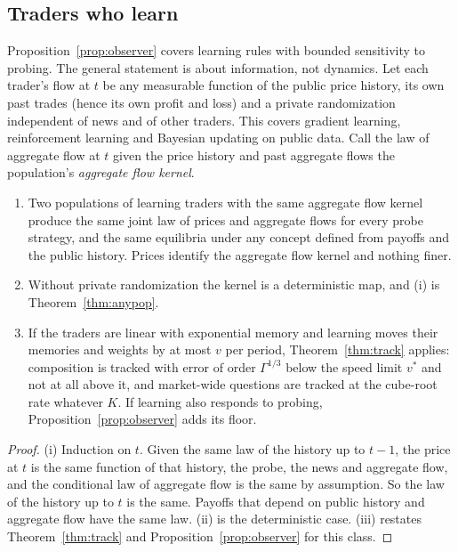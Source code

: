 \subsection{Traders who learn}

Proposition~\ref{prop:observer} covers learning rules with bounded sensitivity to probing. The general statement is about information, not dynamics. Let each trader's flow at $t$ be any measurable function of the public price history, its own past trades (hence its own profit and loss) and a private randomization independent of news and of other traders. This covers gradient learning, reinforcement learning and Bayesian updating on public data. Call the law of aggregate flow at $t$ given the price history and past aggregate flows the population's \emph{aggregate flow kernel}.

\begin{proposition}\label{prop:learners}
\begin{enumerate}[label=(\roman*),itemsep=1pt]
\item Two populations of learning traders with the same aggregate flow kernel produce the same joint law of prices and aggregate flows for every probe strategy, and the same equilibria under any concept defined from payoffs and the public history. Prices identify the aggregate flow kernel and nothing finer.
\item Without private randomization the kernel is a deterministic map, and (i) is Theorem~\ref{thm:anypop}.
\item If the traders are linear with exponential memory and learning moves their memories and weights by at most $v$ per period, Theorem~\ref{thm:track} applies: composition is tracked with error of order $\Gamma^{1/3}$ below the speed limit $v^*$ and not at all above it, and market-wide questions are tracked at the cube-root rate whatever $K$. If learning also responds to probing, Proposition~\ref{prop:observer} adds its floor.
\end{enumerate}
\end{proposition}

\begin{proof}
(i) Induction on $t$. Given the same law of the history up to $t-1$, the price at $t$ is the same function of that history, the probe, the news and aggregate flow, and the conditional law of aggregate flow is the same by assumption. So the law of the history up to $t$ is the same. Payoffs that depend on public history and aggregate flow have the same law. (ii) is the deterministic case. (iii) restates Theorem~\ref{thm:track} and Proposition~\ref{prop:observer} for this class.
\end{proof}

